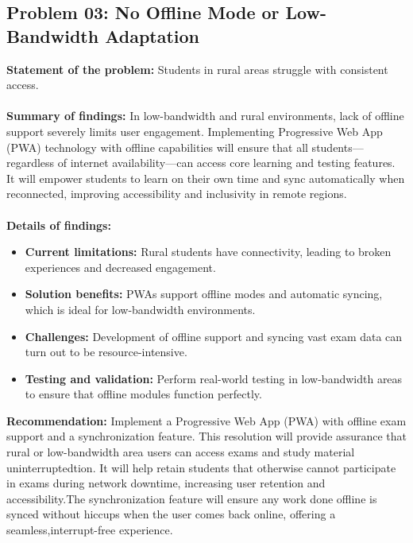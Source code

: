 \documentclass[12pt,a4paper,oneside]{book}
\begin{document}
\subsection{Problem 03: No Offline Mode or Low-Bandwidth Adaptation}
\textbf{Statement of the problem:} Students in rural areas struggle with consistent access.\\ \\
\textbf{Summary of findings:} In low-bandwidth and rural environments, lack of offline support severely limits user engagement. Implementing Progressive Web App (PWA) technology with offline capabilities will ensure that all students—regardless of internet availability—can access core learning and testing features. It will empower students to learn on their own time and sync automatically when reconnected, improving accessibility and inclusivity in remote regions.\\ \\
\textbf{Details of findings:}
\begin{itemize}
    \item \textbf{Current limitations:} Rural students have connectivity, leading to broken experiences and decreased engagement.
    \item \textbf{Solution benefits:} PWAs support offline modes and automatic syncing, which is ideal for low-bandwidth environments.
    \item \textbf{Challenges:} Development of offline support and syncing vast exam data can turn out to be resource-intensive.
    \item \textbf{Testing and validation:} Perform real-world testing in low-bandwidth areas to ensure that offline modules function perfectly.
\end{itemize}
\textbf{Recommendation:} Implement a Progressive Web App (PWA) with offline exam support and a synchronization feature. This resolution will provide assurance that rural or low-bandwidth area users can access exams and study material uninterruptedtion. It will help retain students that otherwise cannot participate in exams during network downtime, increasing user retention and accessibility.The synchronization feature will ensure any work done offline is synced without hiccups when the user comes back online, offering a seamless,interrupt-free experience.
\end{document}
